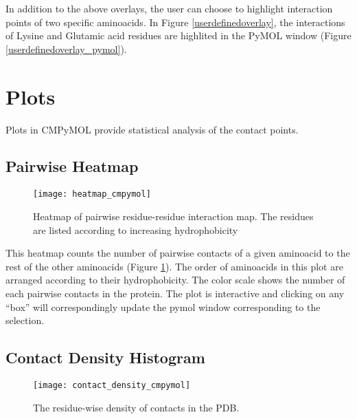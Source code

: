 \documentclass[11pt,fleqn]{book} %
\begin{document}
In addition to the above overlays, the user can choose to highlight interaction points of two specific aminoacids. In Figure \ref{userdefinedoverlay}, the interactions of Lysine and Glutamic acid residues are highlited in the PyMOL window (Figure \ref{userdefinedoverlay_pymol}).

\section{Plots}

Plots in CMPyMOL provide statistical analysis of the contact points.

\subsection{Pairwise Heatmap}

\begin{figure}[ht!]
\centering
  \begin{minipage}{\textwidth}
  \centering
      \texttt{[image: heatmap\_cmpymol]}
      \caption{Heatmap of pairwise residue-residue interaction map. The residues are listed according to increasing hydrophobicity}
  \label{heatmap}
  \end{minipage}
\end{figure}

This heatmap counts the number of pairwise contacts of a given aminoacid to the rest of the other aminoacids (Figure \ref{heatmap}). The order of aminoacids in this plot are arranged according to their hydrophobicity. The color scale shows the number of each pairwise contacts in the protein.
The plot is interactive and clicking on any ``box'' will correspondingly update the pymol window corresponding to the selection.

\subsection{Contact Density Histogram}

\begin{figure}[ht!]
\centering
  \begin{minipage}{\textwidth}
  \centering
      \texttt{[image: contact\_density\_cmpymol]}
      \caption{The residue-wise density of contacts in the PDB.}
  \label{contactdensity}
  \end{minipage}
\end{figure}
\end{document}
